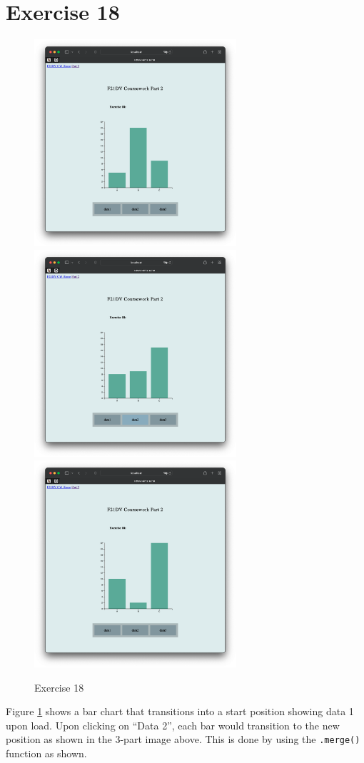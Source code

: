 \documentclass{scrreprt}
\begin{document}
\section{Exercise 18}
\begin{figure}[!ht]
    \centering
    \includegraphics[width = 7.5cm]{images/ex18_1.png}
    \includegraphics[width = 7.5cm]{images/ex18_2.png}
    \includegraphics[width = 7.5cm]{images/ex18_3.png}
    \label{fig:ex18}
    \caption{Exercise 18}
\end{figure}
\FloatBarrier

Figure \ref{fig:ex18} shows a bar chart that transitions into a start position showing data 1 upon load. Upon clicking on ``Data 2'', each bar would transition to the new position as shown in the 3-part image above. This is done by using the \verb|.merge()| function as shown.
\end{document}
